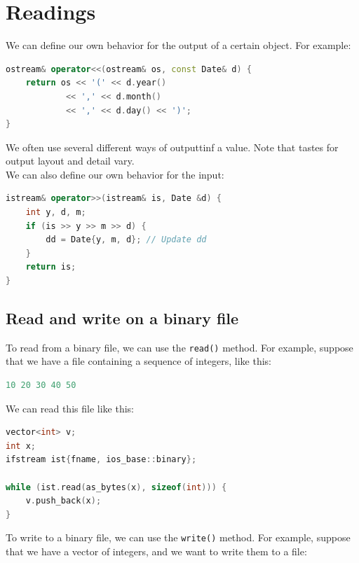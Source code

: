 \newpage

\section{Readings}

We can define our own behavior for the output of a certain object. For example:

\begin{lstlisting}[language=C++]
ostream& operator<<(ostream& os, const Date& d) {
    return os << '(' << d.year()
            << ',' << d.month()
            << ',' << d.day() << ')';
}
\end{lstlisting}

We often use several different ways of outputtinf a value. Note that tastes for output 
layout and detail vary.\\

We can also define our own behavior for the input:\\

\begin{lstlisting}[language=C++]
istream& operator>>(istream& is, Date &d) {
    int y, d, m;
    if (is >> y >> m >> d) {
        dd = Date{y, m, d}; // Update dd
    }
    return is;
}
\end{lstlisting}

\subsection{Read and write on a binary file}

To read from a binary file, we can use the \texttt{read()} method. For example, suppose that we
have a file containing a sequence of integers, like this:\\

\begin{lstlisting}[language=C++]
10 20 30 40 50
\end{lstlisting}

We can read this file like this:\\

\begin{lstlisting}[language=C++]
vector<int> v;
int x;
ifstream ist{fname, ios_base::binary};

while (ist.read(as_bytes(x), sizeof(int))) {
    v.push_back(x);
}
\end{lstlisting}

To write to a binary file, we can use the \texttt{write()} method. For example, suppose that we
have a vector of integers, and we want to write them to a file:\\

